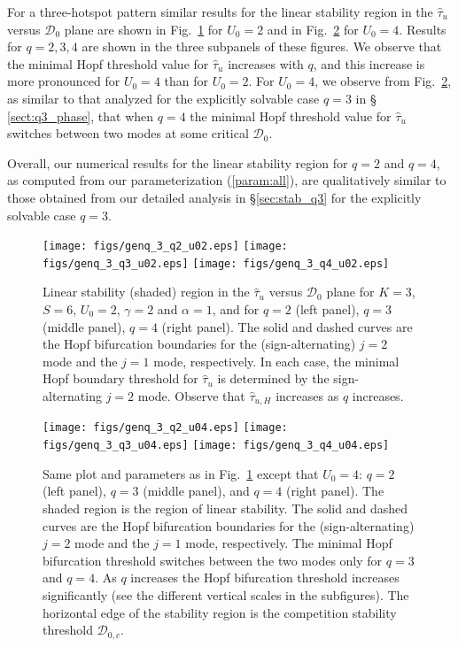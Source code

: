 \documentclass{article}%
\begin{document}
For a three-hotspot pattern similar results for the linear stability
region in the $\hat{\tau}_u$ versus ${\mathcal D}_0$ plane are shown
in Fig.~\ref{fig:genq:k3:hopf_tau_U02} for $U_0=2$ and in
Fig.~\ref{fig:genq:k3:hopf_tau_U04} for $U_0=4$. Results for $q=2,3,4$
are shown in the three subpanels of these figures. We observe that the
minimal Hopf threshold value for $\hat{\tau}_u$ increases with $q$,
and this increase is more pronounced for $U_0=4$ than for $U_0=2$. For
$U_0=4$, we observe from Fig.~\ref{fig:genq:k3:hopf_tau_U04}, as
similar to that analyzed for the explicitly solvable case $q=3$ in \S
\ref{sect:q3_phase}, that when $q=4$ the minimal Hopf threshold value
for $\hat{\tau}_u$ switches between two modes at some critical ${\mathcal
  D}_0$.

Overall, our numerical results for the linear stability region for
$q=2$ and $q=4$, as computed from our parameterization
(\ref{param:all}), are qualitatively similar to those obtained from our
detailed analysis in \S \ref{sec:stab_q3} for the explicitly solvable
case $q=3$.

\begin{figure}[htbp]
\centering
\texttt{[image: figs/genq\_3\_q2\_u02.eps]}
\texttt{[image: figs/genq\_3\_q3\_u02.eps]}
\texttt{[image: figs/genq\_3\_q4\_u02.eps]}
\caption{\label{fig:genq:k3:hopf_tau_U02} Linear stability (shaded)
  region in the $\hat{\tau}_u$ versus ${\mathcal D}_0$ plane for
  $K=3$, $S=6$, $U_0=2$, $\gamma=2$ and $\alpha=1$, and for $q=2$ (left panel),
  $q=3$ (middle panel), $q=4$ (right panel). The solid and dashed
  curves are the Hopf bifurcation boundaries for the
  (sign-alternating) $j=2$ mode and the $j=1$ mode, respectively. In
  each case, the minimal Hopf boundary threshold for $\hat{\tau}_u$ is
  determined by the sign-alternating $j=2$ mode. Observe that
  $\hat{\tau}_{u,H}$ increases as $q$ increases.}
\end{figure}

\begin{figure}[htbp]
\centering
\texttt{[image: figs/genq\_3\_q2\_u04.eps]}
\texttt{[image: figs/genq\_3\_q3\_u04.eps]}
\texttt{[image: figs/genq\_3\_q4\_u04.eps]}
\caption{\label{fig:genq:k3:hopf_tau_U04} Same plot and parameters as
  in Fig.~\ref{fig:genq:k3:hopf_tau_U02} except that $U_0=4$: $q=2$
  (left panel), $q=3$ (middle panel), and $q=4$ (right panel). The
  shaded region is the region of linear stability. The solid and
  dashed curves are the Hopf bifurcation boundaries for the
  (sign-alternating) $j=2$ mode and the $j=1$ mode, respectively. The
  minimal Hopf bifurcation threshold switches between the two modes
  only for $q=3$ and $q=4$. As $q$ increases the Hopf bifurcation
  threshold increases significantly (see the different vertical scales
  in the subfigures). The horizontal edge of the stability region is the
  competition stability threshold ${\mathcal D}_{0,c}$.}
\end{figure}
\end{document}
